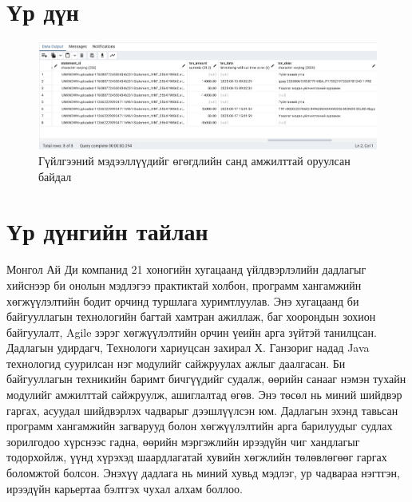 \section{Үр дүн}

\begin{figure}
	\centering
	\includegraphics[width=15cm]{images/result.png}
	\caption{Гүйлгээний мэдээллүүдийг өгөгдлийн санд амжилттай оруулсан байдал}
	\label{fig:result}
\end{figure}
\pagebreak

\pagebreak
\section{Үр дүнгийн тайлан}
Монгол Ай Ди компанид 21 хоногийн хугацаанд үйлдвэрлэлийн дадлагыг хийснээр би онолын мэдлэгээ практиктай холбон, программ хангамжийн хөгжүүлэлтийн бодит орчинд туршлага хуримтлуулав. Энэ хугацаанд би байгууллагын технологийн багтай хамтран ажиллаж, баг хоорондын зохион байгуулалт, Agile зэрэг хөгжүүлэлтийн орчин үеийн арга зүйтэй танилцсан.
Дадлагын удирдагч, Технологи хариуцсан захирал Х. Ганзориг надад Java технологид суурилсан нэг модулийг сайжруулах ажлыг даалгасан. Би байгууллагын техникийн баримт бичгүүдийг судалж, өөрийн санааг нэмэн тухайн модулийг амжилттай сайжруулж, ашиглалтад өгөв. Энэ төсөл нь миний шийдвэр гаргах, асуудал шийдвэрлэх чадварыг дээшлүүлсэн юм.
Дадлагын эхэнд тавьсан программ хангамжийн загварууд болон хөгжүүлэлтийн арга барилуудыг судлах зорилгодоо хүрснээс гадна, өөрийн мэргэжлийн ирээдүйн чиг хандлагыг тодорхойлж, үүнд хүрэхэд шаардлагатай хувийн хөгжлийн төлөвлөгөөг гаргах боломжтой болсон. Энэхүү дадлага нь миний хувьд мэдлэг, ур чадвараа нэгтгэн, ирээдүйн карьертаа бэлтгэх чухал алхам боллоо.